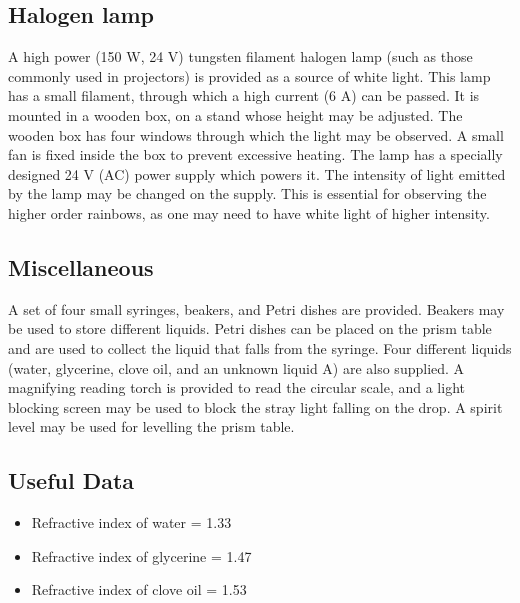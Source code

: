 \subsection*{Halogen lamp}

A high power (150 W, 24 V) tungsten filament halogen lamp (such as those commonly used in projectors) is provided as a source of white light. This lamp has a small filament, through which a high current (6 A) can be passed. It is mounted in a wooden box, on a stand whose height may be adjusted. The wooden box has four windows through which the light may be observed. A small fan is fixed inside the box to prevent excessive heating. The lamp has a specially designed 24 V (AC) power supply which powers it. The intensity of light emitted by the lamp may be changed on the supply. This is essential for observing the higher order rainbows, as one may need to have white light of higher intensity.

\subsection*{Miscellaneous}
A set of four small syringes, beakers, and Petri dishes are provided. Beakers may be used to store different liquids. Petri dishes can be placed on the prism table and are used to collect the liquid that falls from the syringe. Four different liquids (water, glycerine, clove oil, and an unknown liquid A) are also supplied. A magnifying reading torch is provided to read the circular scale, and a light blocking screen may be used to block the stray light falling on the drop. A spirit level may be used for levelling the prism table.

\subsection*{Useful Data}
\begin{itemize}
    \item Refractive index of water = 1.33
    \item Refractive index of glycerine = 1.47
    \item Refractive index of clove oil = 1.53
\end{itemize}

